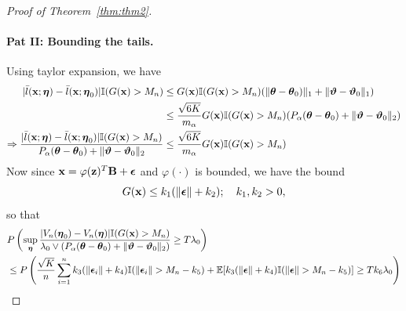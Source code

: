 \documentclass[11pt,letterpaper]{article}
\numberwithin{equation}{section}
\begin{document}
\begin{proof}[Proof of Theorem~\ref{thm:thm2}]
\paragraph{Pat II: Bounding the tails.} Using taylor expansion, we have
%
\begin{align*}
| \bar l({\bf{x}}; {\boldsymbol{\eta}}) -  \bar l({\bf{x}}; {\boldsymbol{\eta}}_0)| {\mathbb{I}}(G({\bf{x}}) > M_n) & \leq
G({\bf{x}}) {\mathbb{I}}(G({\bf{x}}) > M_n) (\| {\boldsymbol{\theta}} - {\boldsymbol{\theta}}_0)\|_1 + \| {\boldsymbol{\vartheta}} - {\boldsymbol{\vartheta}}_0 \|_1) \\
& \leq \frac{\sqrt{6K}}{m_\alpha} G({\bf{x}}) {\mathbb{I}}(G({\bf{x}}) > M_n) ( P_\alpha( {\boldsymbol{\theta}} - {\boldsymbol{\theta}}_0) + \| {\boldsymbol{\vartheta}} - {\boldsymbol{\vartheta}}_0 \|_2) \\
\Rightarrow \frac{| \bar l({\bf{x}}; {\boldsymbol{\eta}}) -  \bar l({\bf{x}}; {\boldsymbol{\eta}}_0)| {\mathbb{I}}(G({\bf{x}}) > M_n)}
{P_\alpha( {\boldsymbol{\theta}} - {\boldsymbol{\theta}}_0) + \| {\boldsymbol{\vartheta}} - {\boldsymbol{\vartheta}}_0 \|_2}
& \leq \frac{\sqrt{6K}}{m_\alpha} G({\bf{x}}) {\mathbb{I}}(G({\bf{x}}) > M_n)
\end{align*}
%
Now since ${\bf{x}} = \varphi({\bf{z}})^T {\mathbf{B}} + {\boldsymbol{\epsilon}}$ and $\varphi(\cdot)$ is bounded, we have the bound
%
$$
G({\bf{x}}) \leq k_1 ( \| {\boldsymbol{\epsilon}} \| + k_2 ); \quad k_1, k_2 > 0,
$$
%
so that
%
\begin{align*}
& P \left( \sup_{\boldsymbol{\eta}} \frac{ |V_n({\boldsymbol{\eta}}_0) - V_n({\boldsymbol{\eta}})| {\mathbb{I}}(G({\bf{x}}) > M_n)}{\lambda_0 \vee
(P_\alpha({\boldsymbol{\theta}} - {\boldsymbol{\theta}}_0) + \| {\boldsymbol{\vartheta}} - {\boldsymbol{\vartheta}}_0 \|_2) } \geq T \lambda_0 \right) \\
& \leq P \left( \frac{\sqrt K}{n} \sum_{i=1}^n k_3 (\| {\boldsymbol{\epsilon}}_i \| + k_4) {\mathbb{I}}(\| {\boldsymbol{\epsilon}}_i \| > M_n - k_5)
+ {\mathbb{E}} [ k_3 (\| {\boldsymbol{\epsilon}} \| + k_4) {\mathbb{I}}(\| {\boldsymbol{\epsilon}} \| > M_n - k_5) ] \geq T k_6 \lambda_0 \right) 
\end{align*}

\end{proof}
%





\end{document}
